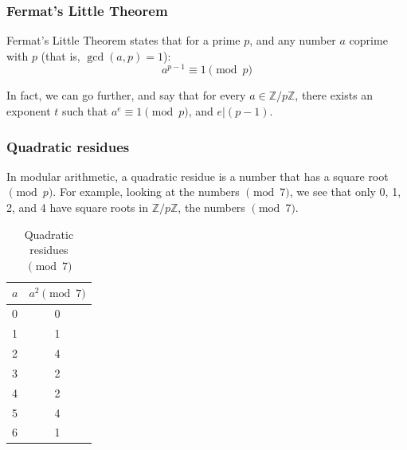 \documentclass{beamer}
\begin{document}
\begin{frame}
	\frametitle{Fermat's Little Theorem}

	Fermat's Little Theorem states that for a prime $p$, and any number $a$ coprime with $p$ 
	(that is, $\gcd(a,p) = 1$):
	\[ a^{p-1} \equiv 1 \pmod{p} \]

	In fact, we can go further, and say that for every $a \in \mathbb{Z}/p\mathbb{Z}$, there exists
	an exponent $t$ such that $a^{e} \equiv 1 \pmod{p}$, and $e | (p-1)$. 

\end{frame}

\begin{frame}
	\frametitle{Quadratic residues}

	In modular arithmetic, a quadratic residue is a number that has a square root
	$\pmod{p}$. For example, looking at the numbers $\pmod{7}$, we see that only 0, 1, 2, 
	and 4 have square roots in $\mathbb{Z}/p\mathbb{Z}$, the numbers $\pmod{7}$.
       \begin{table}
\begin{tabular}{| l | c |}
        \hline
	$a$ & $a^2 \pmod{7}$\\
	\hline
	0 & 0 \\
	1 & 1 \\
	2 & 4 \\
	3 & 2 \\
	4 & 2 \\
	5 & 4 \\
	6 & 1 \\
	\hline
\end{tabular}
	       \caption*{Quadratic residues $\pmod{7}$}
\end{table}


\end{frame}
\end{document}
